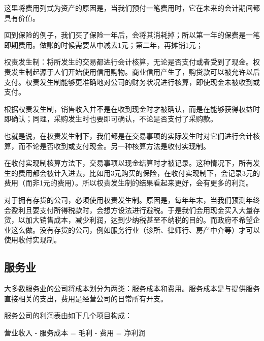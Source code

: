 \documentclass[12pt]{article}
\begin{document}
这里将费用列式为资产的原因是，当我们预付一笔费用时，它在未来的会计期间都具有价值。

回到保险的例子，我们买了保险一年后，会将其消耗掉；所以第一年的保费是一笔即期费用。做账的时候需要从中减去1元；第二年，再摊销1元；

权责发生制：将所发生的交易都进行会计核算，无论是否支付或者受到了现金。权责发生制起源于人们开始使用信用购物。商业信用产生了，购贷款可以被允许以后支付。权责发生制能够更准确地对公司的财务状况进行核算，即使现金未被收到或支付。

根据权责发生制，销售收入并不是在收到现金时才被确认，而是在能够获得权益时即确认；同理，采购发生时也要即可确认，不论是否支付了采购款。

也就是说，在权责发生制下，我们都是在交易事项的实际发生时对它们进行会计核算，而不论是否收到或支付现金。另一种核算方法是收付实现制。

在收付实现制核算方法下，交易事项以现金结算时才被记录。这种情况下，所有发生的费用都会被计入进去，比如用3元购买的保险，在收付实现制下，会记录3元的费用（而非1元的费用）。所以权责发生制的结果看起来更好，会有更多的利润。

对于拥有存货的公司，必须使用权责发生制。原因是，每年年末，当我们预测年终会盈利且要支付所得税款时，会想方设法进行避税。于是我们会用现金买入大量存货，以加大销售成本，减少利润，达到少纳税甚至不纳税的目的。而政府不希望企业这么做。没有存货的公司，例如服务行业（诊所、律师行、房产中介等）才可以使用收付实现制。

\subsection{服务业}
大多数服务业的公司将成本划分为两类：服务成本和费用。服务成本是与提供服务直接相关的支出，费用是经营公司的日常所有开支。

服务公司的利润表由如下几个项目构成：

营业收入 - 服务成本 = 毛利 - 费用 = 净利润






\end{document}
